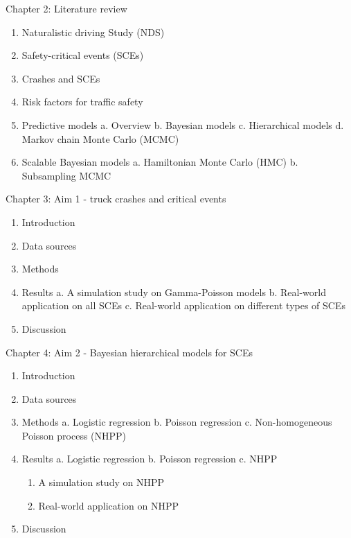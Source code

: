 \documentclass[12pt]{book}
\numberwithin{equation}{chapter}
\providecommand{\tightlist}{%
  \setlength{\itemsep}{0pt}\setlength{\parskip}{0pt}}
\begin{document}
Chapter 2: Literature review

\begin{enumerate}
\def\labelenumi{\arabic{enumi}.}
\tightlist
\item
  Naturalistic driving Study (NDS)
\item
  Safety-critical events (SCEs)
\item
  Crashes and SCEs
\item
  Risk factors for traffic safety
\item
  Predictive models
  a. Overview
  b. Bayesian models
  c. Hierarchical models
  d. Markov chain Monte Carlo (MCMC)
\item
  Scalable Bayesian models
  a. Hamiltonian Monte Carlo (HMC)
  b. Subsampling MCMC
\end{enumerate}

Chapter 3: Aim 1 - truck crashes and critical events

\begin{enumerate}
\def\labelenumi{\arabic{enumi}.}
\tightlist
\item
  Introduction
\item
  Data sources
\item
  Methods
\item
  Results
  a. A simulation study on Gamma-Poisson models
  b. Real-world application on all SCEs
  c. Real-world application on different types of SCEs
\item
  Discussion
\end{enumerate}

Chapter 4: Aim 2 - Bayesian hierarchical models for SCEs

\begin{enumerate}
\def\labelenumi{\arabic{enumi}.}
\tightlist
\item
  Introduction
\item
  Data sources
\item
  Methods
  a. Logistic regression
  b. Poisson regression
  c. Non-homogeneous Poisson process (NHPP)
\item
  Results
  a. Logistic regression
  b. Poisson regression
  c. NHPP

  \begin{enumerate}
  \def\labelenumii{\roman{enumii}.}
  \tightlist
  \item
    A simulation study on NHPP
  \item
    Real-world application on NHPP
  \end{enumerate}
\item
  Discussion
\end{enumerate}
\end{document}
